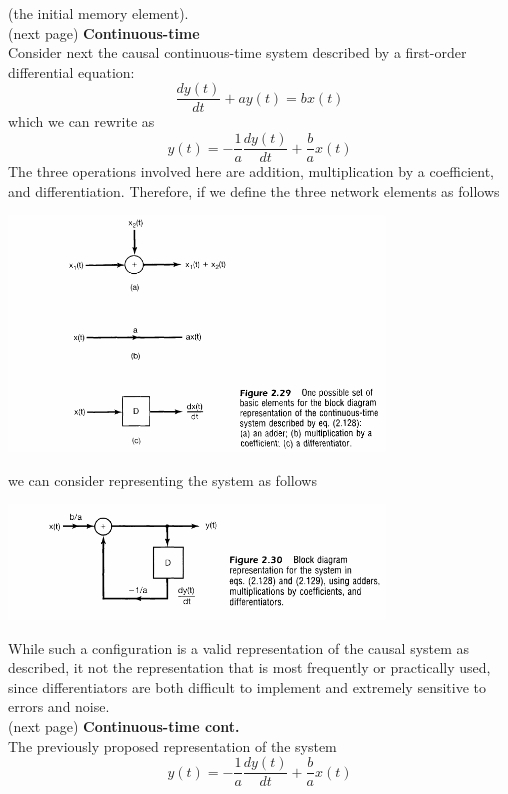 \documentclass{report}
\begin{document}
(the initial memory element).\\
(next page)\newpage
\noindent\textbf{Continuous-time}\\
Consider next the causal continuous-time system described by a first-order differential equation:
\begin{equation*}
\frac{dy(t)}{dt}+ay(t)=bx(t)
\end{equation*}
which we can rewrite as 
\begin{equation*}
y(t)=-\frac{1}{a}\frac{dy(t)}{dt}+\frac{b}{a}x(t)
\end{equation*}
The three operations involved here are addition, multiplication by a coefficient, and differentiation. Therefore, if we define the 
three network elements as follows
\begin{center}
\includegraphics[width=10cm]{a50}
\end{center}
we can consider representing the system as follows
\begin{center}
\includegraphics[width=10cm]{a51}
\end{center}
While such a configuration is a valid representation of the causal system as described, it not the representation that is most frequently
or practically used, since differentiators are both difficult to
implement and extremely sensitive to errors and noise.\\
(next page)\newpage
\noindent\textbf{Continuous-time cont.}\\
The previously proposed representation of the system
\begin{equation*}
y(t)=-\frac{1}{a}\frac{dy(t)}{dt}+\frac{b}{a}x(t)
\end{equation*}
\end{document}
